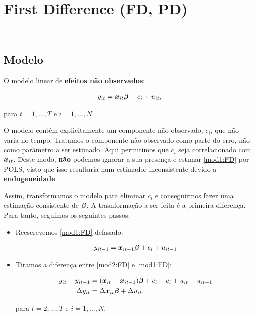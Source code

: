 \documentclass[11pt, oneside, a4paper, article]{article}
\numberwithin{equation}{section}
\begin{document}
\clearpage
\section{First Difference (FD, PD)}
\noindent
\citet[Sec.10.6 -- First Difference Methods, p.279]{wool-2010} \\

\subsection{Modelo}

O modelo linear de \textbf{efeitos não observados}:

\vspace{-1 em}
\begin{align} \label{mod1:FD}
	y_{it} = \boldsymbol{x}_{it} \boldsymbol{\beta} + c_{i} + u_{it},
\end{align}

\noindent
para
$t = 1, \dots, T$ e $i = 1, \dots, N$.

O modelo contém explicitamente um componente não observado, $c_{i}$, que não varia no tempo.
Tratamos o componente não observado como parte do erro, não como parâmetro a ser estimado.
Aqui permitimos que $c_{i}$ seja correlacionado com $\boldsymbol{x}_{it}$.
Deste modo, \textbf{não} podemos ignorar a sua presença e estimar \eqref{mod1:FD} por POLS, visto que isso resultaria num estimador inconsistente devido a \textbf{endogeneidade}.

Assim, transformamos o modelo para eliminar $c_{i}$ e conseguirmos fazer uma estimação consistente de $\boldsymbol{\beta}$.
A trasnformação a ser feita é a primeira diferença.
Para tanto, seguimos os seguintes passos:

\begin{itemize}\itemsep0pt
\item Reescrevemos \eqref{mod1:FD} defasado:

\vspace{-1 em}
\begin{align}  \label{mod2:FD}
	y_{it-1} = \boldsymbol{x}_{it-1} \boldsymbol{\beta} + c_{i} + u_{it-1}
\end{align}

\item Tiramos a diferença entre \eqref{mod2:FD} e \eqref{mod1:FD}:

\vspace{-1 em}
\begin{align}
\nonumber
y_{it} - y_{it-1} &=
(\boldsymbol{x}_{it} - \boldsymbol{x}_{it-1}) \boldsymbol{\beta} +
c_{i} - c_{i} +
u_{it} - u_{it-1}
\\
\label{mod3:FD}
\Delta y_{it} &=
\Delta \boldsymbol{x}_{it} \boldsymbol{\beta} +
\Delta u_{it}. 
\end{align}

\noindent
para
$t = 2, \dots, T$ e $i = 1, \dots, N$.
\end{itemize}
\end{document}
